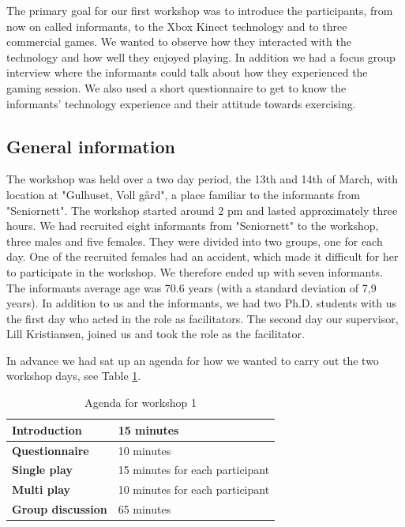 The primary goal for our first workshop was to introduce the participants, from now on called informants, to the Xbox Kinect technology and to three commercial games. We wanted to observe how they interacted with the technology and how well they enjoyed playing. In addition we had a focus group interview where the informants could talk about how they experienced the gaming session. We also used a short questionnaire to get to know the informants' technology experience and their attitude towards exercising.   

\subsection{General information}
The workshop was held over a two day period, the 13th and 14th of March, with location at "Gulhuset, Voll gård", a place familiar to the informants from "Seniornett". The workshop started around 2 pm and lasted approximately three hours. We had recruited eight informants from "Seniornett" to the workshop, three males and five females. They were divided into two groups, one for each day. One of the recruited females had an accident, which made it difficult for her to participate in the workshop. We therefore ended up with seven informants. The informants average age was 70.6 years (with a standard deviation of 7,9 years). In addition to us and the informants, we had two Ph.D. students with us the first day who acted in the role as facilitators. The second day our supervisor, Lill Kristiansen, joined us and took the role as the facilitator.   

In advance we had sat up an agenda for how we wanted to carry out the two workshop days,  see Table \ref{tab:agendaW1}.  

\begin{table} [ht!]
\centering
    \begin{tabular}{|l|l|}
       \hline
       \textbf{Introduction} & 15 minutes  \\ \hline
       \textbf{Questionnaire} & 10 minutes  \\ \hline
       \textbf{Single play} & 15 minutes for each participant \\ \hline
       \textbf{Multi play} & 10 minutes for each participant \\ \hline
	   \textbf{Group discussion} & 65 minutes \\ \hline
    \end{tabular}
    \caption[Workshop 1 agenda]{Agenda for workshop 1}
    \label{tab:agendaW1}
\end{table}  

